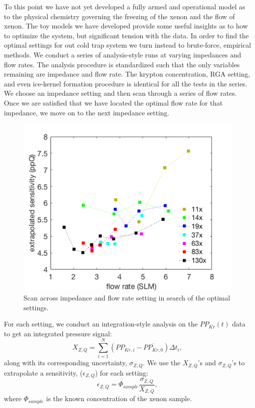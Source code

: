 \documentclass[12pt]{article}
\begin{document}
To this point we have not yet developed a fully armed and operational model as to the physical chemistry governing the freezing of the xenon and the flow of xenon. The toy models we have developed provide some useful insights as to how to optimize the system, but significant tension with the data. In order to find the optimal settings for out cold trap system we turn instead to brute-force, empirical methods. We conduct a series of analysis-style runs at varying impedances and flow rates.  The analysis procedure is standardized such that the only variables remaining are impedance and flow rate. The krypton concentration, RGA setting, and even ice-kernel formation procedure is identical for all the tests in the series. We choose an impedance setting and then scan through a series of flow rates. Once we are satisfied that we have located the optimal flow rate for that impedance, we move on to the next  impedance setting.
\begin{figure}[h]
  \includegraphics[width=\linewidth]{Figures/SLAC_flowimpedance_response_plot.png}
  \caption{Scan across impedance and flow rate setting in search of the optimal settings.}
  \label{fig:sensscan}
\end{figure}

For each setting, we conduct an integration-style analysis on the $PP_{Kr}(t)$ data to get an integrated pressure signal:
\begin{equation}
 X_{Z,Q}=\sum_{i=1}^{N}(PP_{Kr,i}-\overline{PP_{Kr,0}})\Delta t_i,
 \end{equation}
along with its corresponding uncertainty, $\sigma_{Z,Q}$. We use the $X_{Z,Q}$'s and $\sigma_{Z,Q}$'s to extrapolate a sensitivity, ($\epsilon_{Z,Q}$) for each setting:
\begin{equation}
\epsilon_{Z,Q}=\Phi_{sample}\frac{\sigma_{Z,Q}}{X_{Z,Q}},
\end{equation}
where $\Phi_{sample}$ is the known concentration of the xenon sample. 
\end{document}
